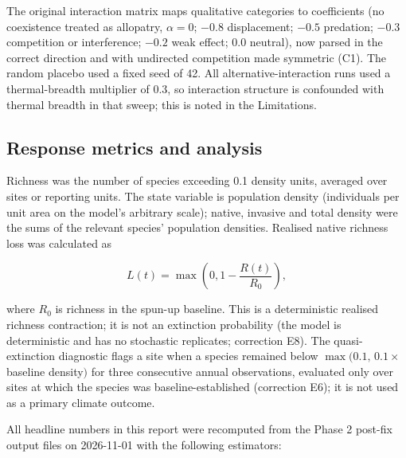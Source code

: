 \documentclass[11pt,a4paper]{article}
\begin{document}
The original interaction matrix maps qualitative categories to coefficients (no coexistence treated as allopatry, $\alpha=0$; $-0.8$ displacement; $-0.5$ predation; $-0.3$ competition or interference; $-0.2$ weak effect; $0.0$ neutral), now parsed in the correct direction and with undirected competition made symmetric (C1). The random placebo used a fixed seed of 42. All alternative-interaction runs used a thermal-breadth multiplier of 0.3, so interaction structure is confounded with thermal breadth in that sweep; this is noted in the Limitations.

\subsection{Response metrics and analysis}

Richness was the number of species exceeding 0.1 density units, averaged over sites or reporting units. The state variable is population density (individuals per unit area on the model's arbitrary scale); native, invasive and total density were the sums of the relevant species' population densities. Realised native richness loss was calculated as

\begin{equation}
L(t)=\max\left(0,1-\frac{R(t)}{R_0}\right),
\end{equation}

where $R_0$ is richness in the spun-up baseline. This is a deterministic realised richness contraction; it is not an extinction probability (the model is deterministic and has no stochastic replicates; correction E8). The quasi-extinction diagnostic flags a site when a species remained below $\max(0.1,\,0.1\times$ baseline density$)$ for three consecutive annual observations, evaluated only over sites at which the species was baseline-established (correction E6); it is not used as a primary climate outcome.

All headline numbers in this report were recomputed from the Phase 2 post-fix output files on 2026-11-01 with the following estimators:
\end{document}
